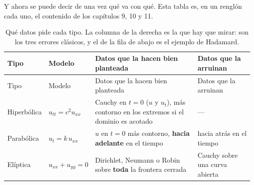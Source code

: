 \documentclass[
  spanish,
  a4paper,
]{scrbook}
\theoremstyle{definition}
\theoremstyle{plain}
\theoremstyle{definition}
\theoremstyle{plain}
\theoremstyle{definition}
\theoremstyle{remark}
\begin{document}
Y ahora se puede decir de una vez qué va con qué. Esta tabla es, en un
renglón cada uno, el contenido de los capítulos 9, 10 y 11.

\begin{longtable}[]{@{}
  >{\raggedright\arraybackslash}p{}
  >{\raggedright\arraybackslash}p{}
  >{\raggedright\arraybackslash}p{}
  >{\raggedright\arraybackslash}p{}@{}}
\caption{Qué datos pide cada tipo. La columna de la derecha es la que
hay que mirar: son los tres errores clásicos, y el de la fila de abajo
es el ejemplo de Hadamard.}\label{tbl-datos}\tabularnewline
\toprule\noalign{}
\begin{minipage}[b]{\linewidth}\raggedright
Tipo
\end{minipage} & \begin{minipage}[b]{\linewidth}\raggedright
Modelo
\end{minipage} & \begin{minipage}[b]{\linewidth}\raggedright
Datos que la hacen bien planteada
\end{minipage} & \begin{minipage}[b]{\linewidth}\raggedright
Datos que la arruinan
\end{minipage} \\
\midrule\noalign{}
\endfirsthead
\toprule\noalign{}
\begin{minipage}[b]{\linewidth}\raggedright
Tipo
\end{minipage} & \begin{minipage}[b]{\linewidth}\raggedright
Modelo
\end{minipage} & \begin{minipage}[b]{\linewidth}\raggedright
Datos que la hacen bien planteada
\end{minipage} & \begin{minipage}[b]{\linewidth}\raggedright
Datos que la arruinan
\end{minipage} \\
\midrule\noalign{}
\endhead
\bottomrule\noalign{}
\endlastfoot
Hiperbólica & \(u_{tt}=c^2u_{xx}\) & Cauchy en \(t=0\) (\(u\) y
\(u_t\)), más contorno en los extremos si el dominio es acotado & --- \\
Parabólica & \(u_t=k\,u_{xx}\) & \(u\) en \(t=0\) más contorno,
\textbf{hacia adelante} en el tiempo & hacia atrás en el tiempo \\
Elíptica & \(u_{xx}+u_{yy}=0\) & Dirichlet, Neumann o Robin sobre
\textbf{toda} la frontera cerrada & Cauchy sobre una curva abierta \\
\end{longtable}
\end{document}
